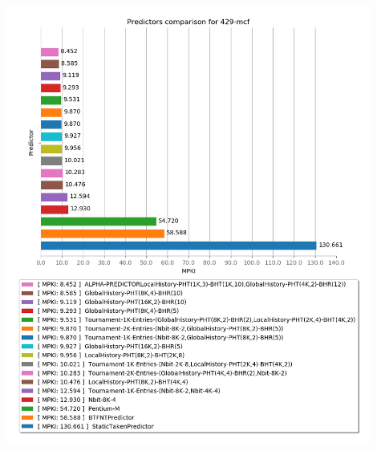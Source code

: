    \begin{minipage}{\textwidth}
      \begin{center}
         \\
         \vspace{3mm}
         \includegraphics[width=0.9\textwidth, frame]{./graphs/4-5/429-mcf.png}
         \vspace{6mm}
      \end{center}
   \end{minipage}

